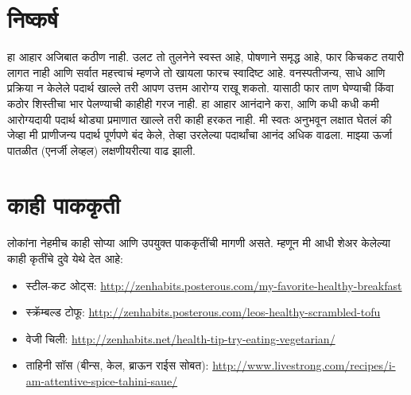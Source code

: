 \section*{निष्कर्ष}
हा आहार अजिबात कठीण नाही. उलट तो तुलनेने स्वस्त आहे, पोषणाने समृद्ध आहे, फार किचकट तयारी लागत नाही आणि सर्वात महत्त्वाचं म्हणजे तो खायला फारच स्वादिष्ट आहे.
वनस्पतीजन्य, साधे आणि प्रक्रिया न केलेले पदार्थ खाल्ले तरी आपण उत्तम आरोग्य राखू शकतो. यासाठी फार ताण घेण्याची किंवा कठोर शिस्तीचा भार पेलण्याची काहीही गरज नाही. हा आहार आनंदाने करा, आणि कधी कधी कमी आरोग्यदायी पदार्थ थोड्या प्रमाणात खाल्ले तरी काही हरकत नाही.
मी स्वतः अनुभवून लक्षात घेतलं की जेव्हा मी प्राणीजन्य पदार्थ पूर्णपणे बंद केले, तेव्हा उरलेल्या पदार्थांचा आनंद अधिक वाढला. माझ्या ऊर्जा पातळीत (एनर्जी लेव्हल) लक्षणीयरीत्या वाढ झाली.
\section*{काही पाककृती}
लोकांना नेहमीच काही सोप्या आणि उपयुक्त पाककृतींची मागणी असते. म्हणून मी आधी शेअर केलेल्या काही कृतींचे दुवे येथे देत आहे:
\begin{itemize}
 \item स्टील-कट ओट्स: \url{http://zenhabits.posterous.com/my-favorite-healthy-breakfast}
 \item स्क्रॅम्बल्ड टोफू: \url{http://zenhabits.posterous.com/leos-healthy-scrambled-tofu}
 \item वेजी चिली: \url{http://zenhabits.net/health-tip-try-eating-vegetarian/}
\item ताहिनी सॉस (बीन्स, केल, ब्राऊन राईस सोबत): \url{http://www.livestrong.com/recipes/i-am-attentive-spice-tahini-saue/}
 \end{itemize}
